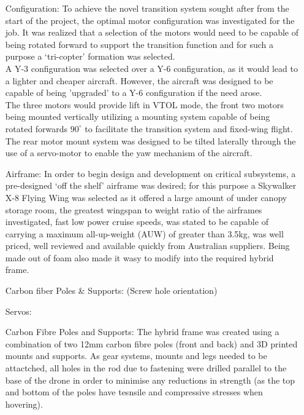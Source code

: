  \begin{itemize}
		\item[Configuration:] 	To achieve the novel transition system sought after from the start of the project, the optimal motor configuration was investigated for the job. It was realized that a selection of the motors would need to be capable of being rotated forward to support the transition function and for such a purpose a `tri-copter' formation was selected.\\
		A Y-3 configuration was selected over a Y-6 configuration, as it would lead to a lighter and cheaper aircraft. However, the aircraft was designed to be capable of being 'upgraded' to a Y-6 configuration if the need arose.\\
		The three motors would provide lift in VTOL mode, the front two motors being mounted vertically utilizing a mounting system capable of being rotated forwards $90^{\circ}$ to facilitate the transition system and fixed-wing flight. The rear motor mount system was designed to be tilted laterally through the use of a servo-motor to enable the yaw mechanism of the aircraft.\\
	
		\item[Airframe:] 	In order to begin design and development on critical subsystems, a pre-designed `off the shelf' airframe was desired; for this purpose a Skywalker X-8 Flying Wing was selected as it offered a large amount of under canopy storage room, the greatest wingspan to weight ratio of the airframes investigated, fast low power cruise speeds, was stated to be capable of carrying a maximum all-up-weight (AUW) of greater than 3.5kg, was well priced, well reviewed and available quickly from Australian suppliers. Being made out of foam also made it wasy to modify into the required hybrid frame.
		
		\item[Carbon fiber Poles \& Supports:] (Screw hole orientation)
		
		\item[Servos:]
		
		\item[Carbon Fibre Poles and Supports:] The hybrid frame was created using a combination of two 12mm carbon fibre poles (front and back) and 3D printed mounts and supports. As gear systems, mounts and legs needed to be attactched, all holes in the rod due to fastening were drilled parallel to the base of the drone in order to minimise any reductions in strength (as the top and bottom of the poles have tesnsile and compressive stresses when hovering).
	

\end{itemize}
